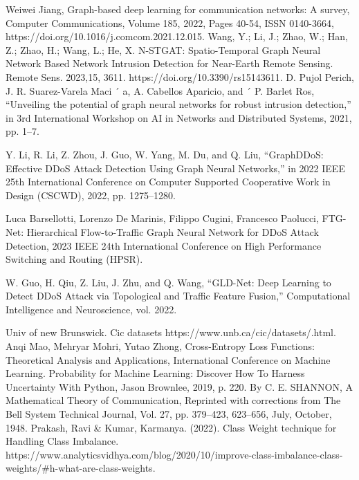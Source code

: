 \begin{thebibliography}{00}
Weiwei Jiang, Graph-based deep learning for communication networks: A survey, Computer Communications, Volume 185, 2022, Pages 40-54, ISSN 0140-3664, https://doi.org/10.1016/j.comcom.2021.12.015.
 Wang, Y.; Li, J.; Zhao, W.; Han, Z.; Zhao, H.; Wang, L.; He, X. N-STGAT: Spatio-Temporal Graph Neural Network Based Network Intrusion Detection for Near-Earth Remote Sensing. Remote Sens. 2023,15, 3611. https://doi.org/10.3390/rs15143611.
D. Pujol Perich, J. R. Suarez-Varela Maci ´ a, A. Cabellos Aparicio, and ´ P. Barlet Ros, “Unveiling the potential of graph neural networks for robust intrusion detection,” in 3rd International Workshop on AI in Networks and Distributed Systems, 2021, pp. 1–7.

Y. Li, R. Li, Z. Zhou, J. Guo, W. Yang, M. Du, and Q. Liu, “GraphDDoS: Effective DDoS Attack Detection Using Graph Neural Networks,” in 2022 IEEE 25th International Conference on Computer Supported Cooperative Work in Design (CSCWD), 2022, pp. 1275–1280.

Luca Barsellotti, Lorenzo De Marinis, Filippo Cugini, Francesco Paolucci, FTG-Net: Hierarchical Flow-to-Traffic Graph Neural Network for DDoS Attack Detection, 2023 IEEE 24th International Conference on High Performance Switching and Routing (HPSR).

W. Guo, H. Qiu, Z. Liu, J. Zhu, and Q. Wang, “GLD-Net: Deep Learning to Detect DDoS Attack via Topological and Traffic Feature Fusion,” Computational Intelligence and Neuroscience, vol. 2022.




Univ of new Brunswick. Cic datasets https://www.unb.ca/cic/datasets/.html.
Anqi Mao, Mehryar Mohri, Yutao Zhong, Cross-Entropy Loss Functions: Theoretical Analysis and Applications, International Conference on Machine Learning.
 Probability for Machine Learning: Discover How To Harness Uncertainty With Python, Jason Brownlee, 2019, p. 220.
By C. E. SHANNON, A Mathematical Theory of Communication, Reprinted with corrections from The Bell System Technical Journal, Vol. 27, pp. 379–423, 623–656, July, October, 1948.
Prakash, Ravi \& Kumar, Karmanya. (2022). Class Weight technique for Handling Class Imbalance.
https://www.analyticsvidhya.com/blog/2020/10/improve-class-imbalance-class-weights/\#h-what-are-class-weights.



\end{thebibliography}

